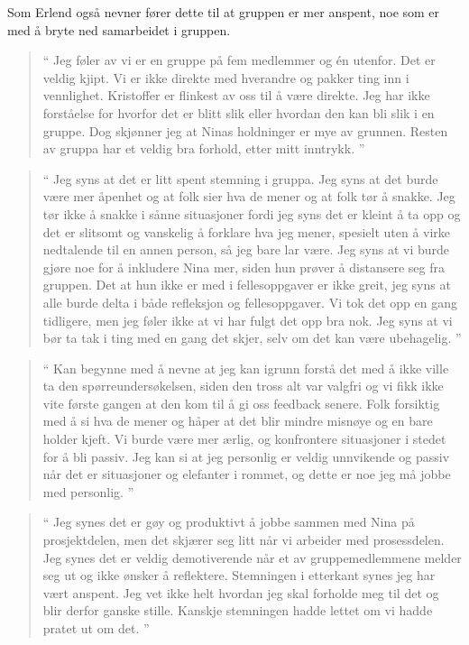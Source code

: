 Som Erlend også nevner fører dette til at gruppen er mer anspent, noe som er med å bryte ned samarbeidet i gruppen. 

\begin{quote}``
Jeg føler av vi er en gruppe på fem medlemmer og én utenfor. Det er veldig kjipt.
Vi er ikke direkte med hverandre og pakker ting inn i vennlighet. Kristoffer er flinkest av oss til å være direkte.
Jeg har ikke forståelse for hvorfor det er blitt slik eller hvordan den kan bli slik i en gruppe. Dog skjønner jeg at 
Ninas holdninger er mye av grunnen. Resten av gruppa har et veldig bra forhold, etter mitt inntrykk.
''\end{quote} 

\begin{quote}``
Jeg syns at det er litt spent stemning i gruppa. Jeg syns at det burde være mer åpenhet og at folk sier hva de 
mener og at folk tør å snakke. Jeg tør ikke å snakke i sånne situasjoner fordi jeg syns det er kleint å ta opp og det 
er slitsomt og vanskelig å forklare hva jeg mener, spesielt uten å virke nedtalende til en annen person, så jeg bare 
lar være. Jeg syns at vi burde gjøre noe for å inkludere Nina mer, siden hun prøver å distansere seg fra gruppen. 
Det at hun ikke er med i fellesoppgaver er ikke greit, jeg syns at alle burde delta i både refleksjon og 
fellesoppgaver. Vi tok det opp en gang tidligere, men jeg føler ikke at vi har fulgt det opp bra nok. Jeg syns at vi bør 
ta tak i ting med en gang det skjer, selv om det kan være ubehagelig.
''\end{quote} 

\begin{quote}``
Kan begynne med å nevne at jeg kan igrunn forstå det med å ikke ville ta den spørreundersøkelsen, siden den 
tross alt var valgfri og vi fikk ikke vite første gangen at den kom til å gi oss feedback senere. Folk forsiktig med å si 
hva de mener og håper at det blir mindre misnøye og en bare holder kjeft. Vi burde være mer ærlig, og konfrontere 
situasjoner i stedet for å bli passiv. Jeg kan si at jeg personlig er veldig unnvikende og passiv når det er situasjoner 
og elefanter i rommet, og dette er noe jeg må jobbe med personlig.
''\end{quote} 

\begin{quote}``
Jeg synes det er gøy og produktivt å jobbe sammen med Nina på prosjektdelen, men det skjærer seg litt når vi 
arbeider med prosessdelen. Jeg synes det er veldig demotiverende når et av gruppemedlemmene melder seg ut 
og ikke ønsker å reflektere. Stemningen i etterkant synes jeg har vært anspent. Jeg vet ikke helt hvordan jeg skal 
forholde meg til det og blir derfor ganske stille. Kanskje stemningen hadde lettet om vi hadde pratet ut om det.
''\end{quote} 

